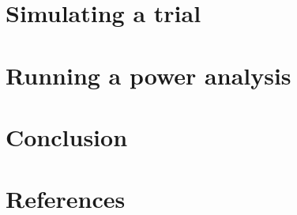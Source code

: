 \documentclass[11pt]{report}
\begin{document}
\section*{Simulating a trial}

\section*{Running a power analysis}

\section*{Conclusion}

\section*{References}
\end{document}
